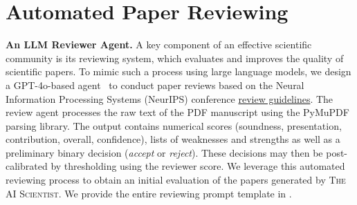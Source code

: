 \documentclass[11pt, a4paper]{include/gdm_format}
\newcommand{\ouralgo}{\textsc{The AI Scientist}\xspace}
\begin{document}
%

\section{Automated Paper Reviewing}
%
\label{sec:reviewer}
%
\textbf{An LLM Reviewer Agent.} A key component of an effective scientific community is its reviewing system, which evaluates and improves the quality of scientific papers.
To mimic such a process using large language models, we design a GPT-4o-based agent~\citep{gpt4} to conduct paper reviews based on the Neural Information Processing Systems (NeurIPS) conference \href{https://neurips.cc/Conferences/2022/ReviewerGuidelines}{review guidelines}.
The review agent processes the raw text of the PDF manuscript using the PyMuPDF parsing library.
The output contains numerical scores (soundness, presentation, contribution, overall, confidence), lists of weaknesses and strengths as well as a preliminary binary decision (\textit{accept} or \textit{reject}).
These decisions may then be post-calibrated by thresholding using the reviewer score.
We leverage this automated reviewing process to obtain an initial evaluation of the papers generated by \ouralgo.
We provide the entire reviewing prompt template in .

%

%
%
%
%
%
%
%
%
%
%
%
%
%
%
%
%
%
%
%
%
%
%
%
%
%
%
%
%
%
%
%
%
%

%
%
%
%
%
%
%
%
%
%
%
%
%
%
%
%
%
%
%
%
%
%
%
%
%
%
%
%
\end{document}
